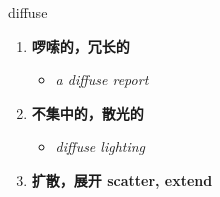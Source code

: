 
\begin{frame}
{\huge diffuse}
\begin{center}
\begin{enumerate}\Large
  \item \textbf{啰嗦的，冗长的}
  \begin{itemize}
    \item \em{\Large{a diffuse report}}
  \end{itemize}
  \item \textbf{不集中的，散光的}
  \begin{itemize}
    \item \em{\Large{diffuse lighting}}
  \end{itemize}
  \item \textbf{扩散，展开 scatter, extend}
\end{enumerate}
\end{center}
\end{frame}
